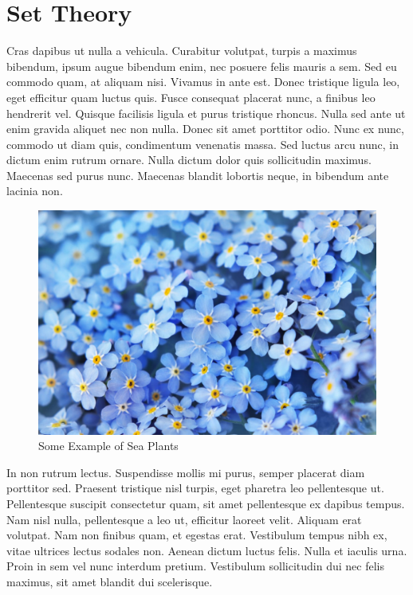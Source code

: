 \documentclass[a4paper, 12pt]{article}
\begin{document}
	\section{Set Theory}
	Cras dapibus ut nulla a vehicula. Curabitur volutpat, turpis a maximus bibendum, ipsum augue bibendum enim, nec posuere felis mauris a sem. Sed eu commodo quam, at aliquam nisi. Vivamus in ante est. Donec tristique ligula leo, eget efficitur quam luctus quis. Fusce consequat placerat nunc, a finibus leo hendrerit vel. Quisque facilisis ligula et purus tristique rhoncus. Nulla sed ante ut enim gravida aliquet nec non nulla. Donec sit amet porttitor odio. Nunc ex nunc, commodo ut diam quis, condimentum venenatis massa. Sed luctus arcu nunc, in dictum enim rutrum ornare. Nulla dictum dolor quis sollicitudin maximus. Maecenas sed purus nunc. Maecenas blandit lobortis neque, in bibendum ante lacinia non.
	\begin{figure}[h!]
		\centering
		\includegraphics[scale=.3]{images/f3.jpeg}
		\caption{Some Example of Sea Plants}
		\label{fig:f2}
	\end{figure}
	
	In non rutrum lectus. Suspendisse mollis mi purus, semper placerat diam porttitor sed. Praesent tristique nisl turpis, eget pharetra leo pellentesque ut. Pellentesque suscipit consectetur quam, sit amet pellentesque ex dapibus tempus. Nam nisl nulla, pellentesque a leo ut, efficitur laoreet velit. Aliquam erat volutpat. Nam non finibus quam, et egestas erat. Vestibulum tempus nibh ex, vitae ultrices lectus sodales non. Aenean dictum luctus felis. Nulla et iaculis urna. Proin in sem vel nunc interdum pretium. Vestibulum sollicitudin dui nec felis maximus, sit amet blandit dui scelerisque.
	
\end{document}
